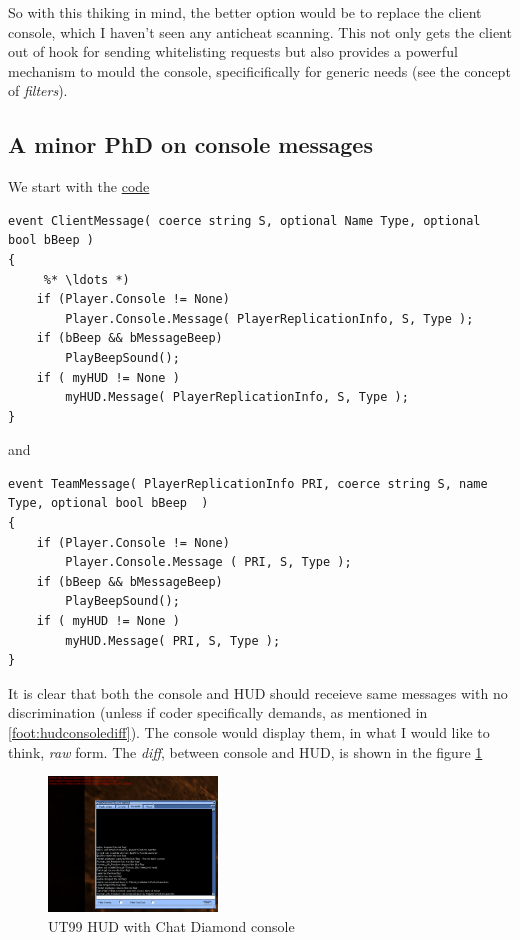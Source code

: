 \documentclass{article}
\theoremstyle{definition}
\begin{document}
So with this thiking in mind, the better option would be to replace the client console, which I haven't seen any anticheat scanning. This not only gets the client out of hook for sending whitelisting requests but also provides a powerful mechanism to mould the console, specificifically for generic needs (see the concept of \emph{filters}).

\subsection{A minor PhD on console messages}

We start with the \href{http://uncodex.ut-files.com/UT/v436/Source_engine/playerpawn.html}{code} 

\begin{lstlisting}[frame=single]
event ClientMessage( coerce string S, optional Name Type, optional bool bBeep )
{
     %* \ldots *)    
    if (Player.Console != None)
        Player.Console.Message( PlayerReplicationInfo, S, Type );
    if (bBeep && bMessageBeep)
        PlayBeepSound();
    if ( myHUD != None )
        myHUD.Message( PlayerReplicationInfo, S, Type );
}       
\end{lstlisting}
and
\begin{lstlisting}[frame=single]
event TeamMessage( PlayerReplicationInfo PRI, coerce string S, name Type, optional bool bBeep  )
{
    if (Player.Console != None)
        Player.Console.Message ( PRI, S, Type );
    if (bBeep && bMessageBeep)
        PlayBeepSound();
    if ( myHUD != None )
        myHUD.Message( PRI, S, Type );
}     
\end{lstlisting}

It is clear that both the console and HUD should receieve same messages with no discrimination (unless if coder specifically demands, as mentioned in \ref{foot:hudconsolediff}).  The console would display them, in what I would like to think, \emph{raw} form.  The \emph{diff}, between console and HUD, is shown in the figure \ref{fig:chatdiamond_console_hud}

\begin{figure}
\centering
\includegraphics[width=0.4\textwidth]{consoleundhud}
\caption{UT99 HUD with Chat Diamond console}
\label{fig:chatdiamond_console_hud}
\end{figure}
\end{document}
